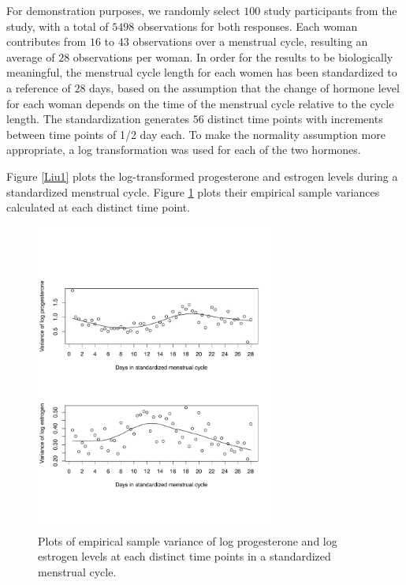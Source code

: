 \documentclass[review]{elsarticle}
\begin{document}
For demonstration purposes, we randomly select  $100$ study participants from the study, with a total of $5498$ observations for both responses. 
Each woman contributes from $16$ to $43$ observations over a menstrual cycle, resulting an average of $28$ observations per woman.
In order for the results to be biologically meaningful, the menstrual cycle length for each women has been standardized to a reference of $28$ days, based on the assumption that the change of hormone level for each woman depends on the time of the menstrual cycle relative to the cycle length. The standardization generates $56$ distinct time points with increments between time points of 1/2 day each. To make the normality assumption more appropriate, a log transformation was used for each of the two hormones. 

Figure \ref{Liu1} plots the log-transformed progesterone and estrogen levels during a standardized menstrual cycle. Figure \ref{Liu2} plots their empirical sample variances calculated at each distinct time point. 

\begin{figure}[h!]
\centering
\includegraphics[width=0.7\textwidth]{bivLiuFig2.pdf}
\caption{Plots of empirical sample variance of log progesterone  and log estrogen levels at each distinct time points in a standardized menstrual cycle.}
\label{Liu2}
\end{figure}
\end{document}
